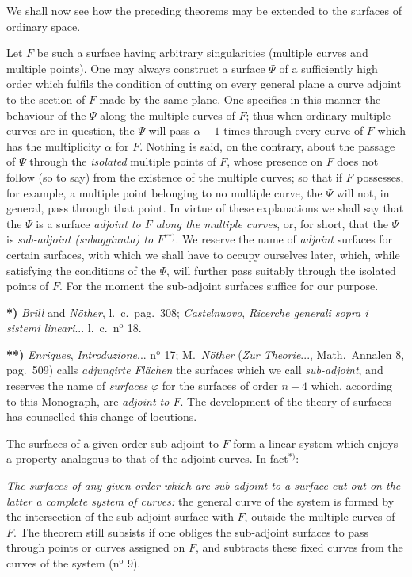 \documentclass{article}
\begin{document}
We shall now see how the preceding theorems may be extended to the surfaces of ordinary space.

Let $F$ be such a surface having arbitrary singularities (multiple curves and multiple points). One may always construct a surface $\Psi$ of a sufficiently high order which fulfils the condition of cutting on every general plane a curve adjoint to the section of $F$ made by the same plane. One specifies in this manner the behaviour of the $\Psi$ along the multiple curves of $F$; thus when ordinary multiple curves are in question, the $\Psi$ will pass $\alpha - 1$ times through every curve of $F$ which has the multiplicity $\alpha$ for $F$. Nothing is said, on the contrary, about the passage of $\Psi$ through the \emph{isolated} multiple points of $F$, whose presence on $F$ does not follow (so to say) from the existence of the multiple curves; so that if $F$ possesses, for example, a multiple point belonging to no multiple curve, the $\Psi$ will not, in general, pass through that point. In virtue of these explanations we shall say that the $\Psi$ is a surface \emph{adjoint to $F$ along the multiple curves}, or, for short, that the $\Psi$ is \emph{sub-adjoint (subaggiunta) to $F$}${}^{**)}$. We reserve the name of \emph{adjoint} surfaces for certain surfaces, with which we shall have to occupy ourselves later, which, while satisfying the conditions of the $\Psi$, will further pass suitably through the isolated points of $F$. For the moment the sub-adjoint surfaces suffice for our purpose.

\textbf{*)} \emph{Brill} and \emph{Nöther}, l.\ c.\ pag.\ 308; \emph{Castelnuovo}, \emph{Ricerche generali sopra i sistemi lineari}... l.\ c.\ n${}^{\text{o}}$ 18.

\textbf{**)} \emph{Enriques}, \emph{Introduzione}... n${}^{\text{o}}$ 17; M.\ \emph{Nöther} (\emph{Zur Theorie}..., Math.\ Annalen 8, pag.\ 509) calls \emph{adjungirte Flächen} the surfaces which we call \emph{sub-adjoint}, and reserves the name of \emph{surfaces} $\varphi$ for the surfaces of order $n - 4$ which, according to this Monograph, are \emph{adjoint to $F$}. The development of the theory of surfaces has counselled this change of locutions.


The surfaces of a given order sub-adjoint to $F$ form a linear system which enjoys a property analogous to that of the adjoint curves. In fact${}^{*)}$:

\emph{The surfaces of any given order which are sub-adjoint to a surface cut out on the latter a complete system of curves:} the general curve of the system is formed by the intersection of the sub-adjoint surface with $F$, outside the multiple curves of $F$. The theorem still subsists if one obliges the sub-adjoint surfaces to pass through points or curves assigned on $F$, and subtracts these fixed curves from the curves of the system (n${}^{\text{o}}$ 9).
\end{document}
